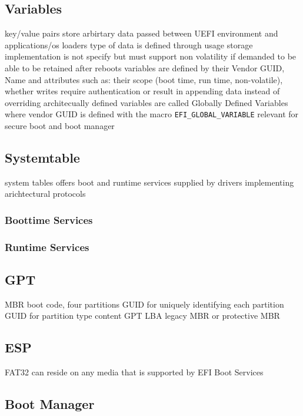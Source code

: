 \subsection{Variables}
key/value pairs
store arbirtary data passed between UEFI environment and applications/os loaders
type of data is defined through usage
storage implementation is not specify but must support non volatility if demanded to be able to be retained after reboots
variables are defined by their Vendor GUID, Name and attributes such as: their scope (boot time, run time, non-volatile), whether writes require authentication or result in appending data instead of overriding
\cite[8.2]{uefi-spec}
architecually defined variables are called Globally Defined Variables where vendor GUID is defined with the macro \lstinline{EFI_GLOBAL_VARIABLE}
\cite[3.3]{uefi-spec}
relevant for secure boot and boot manager

\subsection{Systemtable}
system tables offers boot and runtime services
supplied by drivers implementing arichtectural protocols %
\subsubsection{Boottime Services}
\subsubsection{Runtime Services}

\subsection{\acf{GPT}}
\ac{MBR} boot code, four partitions
\ac{GUID} for uniquely identifying each partition
\ac{GUID} for partition type content
\ac{GPT}
\ac{LBA}
legacy \ac{MBR} or protective \ac{MBR}


\cite[5]{uefi-spec}
\subsection{\acf{ESP}}
\ac{FAT}32 \cite[13.3]{uefi-spec}
can reside on any media that is supported by EFI Boot Services
\cite[13.3.1]{uefi-spec}

\subsection{Boot Manager}

